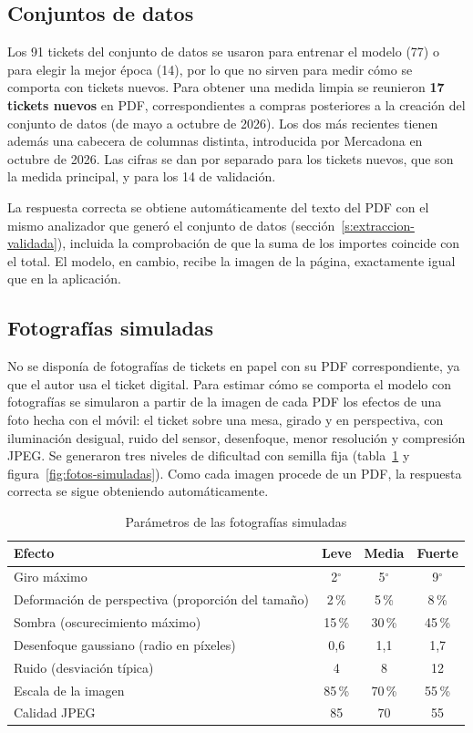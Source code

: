 \subsection{Conjuntos de datos}
Los 91 tickets del conjunto de datos se usaron para entrenar el modelo (77) o para elegir la mejor época (14), por lo que no sirven para medir cómo se comporta con tickets nuevos. Para obtener una medida limpia se reunieron \textbf{17 tickets nuevos} en PDF, correspondientes a compras posteriores a la creación del conjunto de datos (de mayo a octubre de 2026). Los dos más recientes tienen además una cabecera de columnas distinta, introducida por Mercadona en octubre de 2026. Las cifras se dan por separado para los tickets nuevos, que son la medida principal, y para los 14 de validación.

La respuesta correcta se obtiene automáticamente del texto del PDF con el mismo analizador que generó el conjunto de datos (sección~\ref{s:extraccion-validada}), incluida la comprobación de que la suma de los importes coincide con el total. El modelo, en cambio, recibe la imagen de la página, exactamente igual que en la aplicación.

\subsection{Fotografías simuladas}
\label{s:fotos-simuladas}
No se disponía de fotografías de tickets en papel con su PDF correspondiente, ya que el autor usa el ticket digital. Para estimar cómo se comporta el modelo con fotografías se simularon a partir de la imagen de cada PDF los efectos de una foto hecha con el móvil: el ticket sobre una mesa, girado y en perspectiva, con iluminación desigual, ruido del sensor, desenfoque, menor resolución y compresión JPEG. Se generaron tres niveles de dificultad con semilla fija (tabla~\ref{tab:niveles-foto} y figura~\ref{fig:fotos-simuladas}). Como cada imagen procede de un PDF, la respuesta correcta se sigue obteniendo automáticamente.

\begin{table}[htbp]
    \caption{\label{tab:niveles-foto}Parámetros de las fotografías simuladas}
    \begin{tabularx}{\textwidth}{@{}Xccc@{}}
        \toprule
        \textbf{Efecto} & \textbf{Leve} & \textbf{Media} & \textbf{Fuerte} \\
        \midrule
        Giro máximo & 2$^{\circ}$ & 5$^{\circ}$ & 9$^{\circ}$ \\
        Deformación de perspectiva (proporción del tamaño) & 2\,\% & 5\,\% & 8\,\% \\
        Sombra (oscurecimiento máximo) & 15\,\% & 30\,\% & 45\,\% \\
        Desenfoque gaussiano (radio en píxeles) & 0,6 & 1,1 & 1,7 \\
        Ruido (desviación típica) & 4 & 8 & 12 \\
        Escala de la imagen & 85\,\% & 70\,\% & 55\,\% \\
        Calidad JPEG & 85 & 70 & 55 \\
        \bottomrule
    \end{tabularx}
\end{table}

